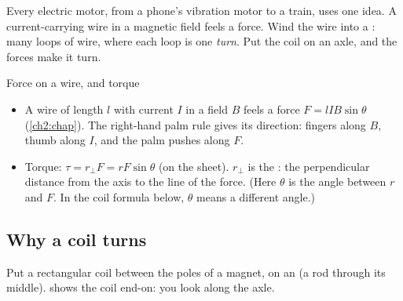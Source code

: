 \begin{keywords}
\end{keywords}

Every electric motor, from a phone's vibration motor to a train, uses one idea. A
current-carrying wire in a magnetic field feels a force. Wind the wire into a
: many loops of wire, where each loop is one \emph{turn}. Put the coil on an
axle, and the forces make it turn.

\begin{refresher}{Force on a wire, and torque}
\begin{itemize}
  \item A wire of length $l$ with current $I$ in a field $B$ feels a force
        $F = lIB\sin\theta$ (\cref{ch2:chap}). The right-hand palm rule gives its
        direction: fingers along $B$, thumb along $I$, and the palm pushes along $F$.
  \item Torque: $\tau = r_\perp F = rF\sin\theta$ (on the sheet). $r_\perp$ is the
        : the perpendicular distance from the axis to the line of the
        force. (Here $\theta$ is the angle between $r$ and $F$. In the coil formula
        below, $\theta$ means a different angle.)
\end{itemize}
\end{refresher}

\subsection{Why a coil turns}
Put a rectangular coil between the poles of a magnet, on an  (a rod through
its middle).  shows the coil end-on: you look along the axle.

